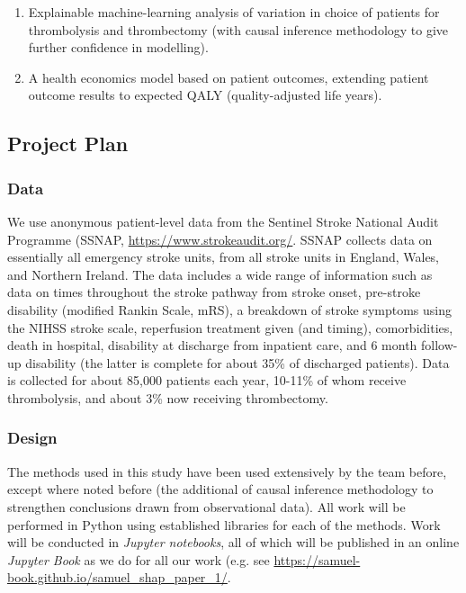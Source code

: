 \begin{itemize}
\begin{enumerate}
        \item Explainable machine-learning analysis of variation in choice of patients for thrombolysis and thrombectomy (with causal inference methodology to give further confidence in modelling).

        \item A health economics model based on patient outcomes, extending patient outcome results to expected QALY (quality-adjusted life years).
    \end{enumerate} 
    
\end{itemize}

\subsection{Project Plan}

\subsubsection{Data}

We use anonymous patient-level data from the Sentinel Stroke National Audit Programme (SSNAP, \url{https://www.strokeaudit.org/}. SSNAP collects data on essentially all emergency stroke units, from all stroke units in England, Wales, and Northern Ireland. The data includes a wide range of information such as data on times throughout the stroke pathway from stroke onset, pre-stroke disability (modified Rankin Scale, mRS), a breakdown of stroke symptoms using the NIHSS stroke scale, reperfusion treatment given (and timing), comorbidities, death in hospital, disability at discharge from inpatient care, and 6 month follow-up disability (the latter is complete for about 35\% of discharged patients). Data is collected for about 85,000 patients each year, 10-11\% of whom receive thrombolysis, and about 3\% now receiving thrombectomy.

\subsubsection{Design}

The methods used in this study have been used extensively by the team before, except where noted before (the additional of causal inference methodology to strengthen conclusions drawn from observational data). All work will be performed in Python using established libraries for each of the methods. Work will be conducted in \textit{Jupyter notebooks}, all of which will be published in an online \textit{Jupyter Book} as we do for all our work (e.g. see \url{https://samuel-book.github.io/samuel_shap_paper_1/}.

